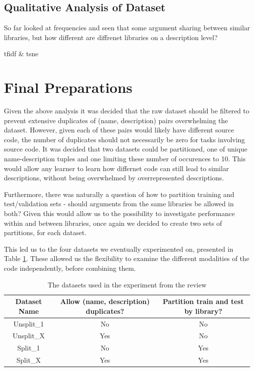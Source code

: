 
\subsection{Qualitative Analysis of Dataset} %
\label{sub:qualitative_analysis_}
So far looked at frequencies and seen that some argument sharing between similar libraries, but how different are diffrenet libraries on a description level?


tfidf \& tsne


\section{Final Preparations} %
\label{sec:final_preparations}

Given the above analysis it was decided that the raw dataset should be filtered to prevent extensive duplicates of (name, description) pairs overwhelming the dataset.
However, given each of these pairs would likely have different source code, the number of duplicates should not necessarily be zero for tasks involving source code. 
It was decided that two datasets could be partitioned, one of unique name-description tuples and one limiting these number of occurences to 10. 
This would allow any learner to learn how differnet code can still lead to similar descriptions, without being overwhelmed by overrepresented descriptions.

Furthermore, there was naturally a question of how to partition training and test/validation sets - should arguments from the same libraries be allowed in both? 
Given this would allow us to the possibility to investigate performance within and between libraries, once again we decided to create two sets of partitions, for each dataset. 

This led us to the four datasets we eventually experimented on, presented in Table \ref{table:thefinaldataset}. These allowed us the flexibility to examine the different modalities of the code independently, before combining them.

\begin{table}
    \begin{center}    
    \begin{tabular}{c | c | c|}
     Dataset Name & Allow (name, description) duplicates? & Partition train and test by library? \\
    \hline
    Unsplit\_1    & No                        & No   \\
    Unsplit\_X    & Yes                       & No   \\
    Split\_1      & No                       & Yes  \\
    Split\_X      & Yes                       & Yes  \\
    \end{tabular}
    \end{center}
    \caption { The datasets used in the experiment from the review }
    \label{table:thefinaldataset} 

\end{table}

